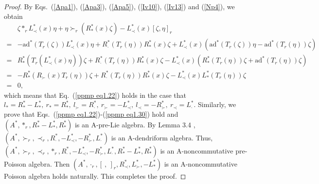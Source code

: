 \documentclass[12pt]{amsart}
\theoremstyle{definition}
\begin{document}
\begin{proof} 
By Eqs.~(\ref{Apa1}), (\ref{Apa3}), (\ref{Apa5}), (\ref{Iv10}), (\ref{Iv13}) and (\ref{Np4}), we obtain
\begin{align*}
	&\zeta \ast_{r} L_{\prec}^{*}(x)\eta+\eta \succ_{r}(R_{\ast}^{*}(x)\zeta)-L_{\prec}^{*}(x)[\zeta, \eta]_{r}\\=&
-\mathrm{ad}^{*} (T_{r}(\zeta))L_{\prec}^{*}(x)\eta+R_{\cdot}^{*}(T_{r}(\eta))R_{\ast}^{*}(x)\zeta
+L_{\prec}^{*}(x)(\mathrm{ad}^{*} (T_{r}(\zeta))\eta-\mathrm{ad}^{*} (T_{r}(\eta))\zeta)
\\=&R_{\ast}^{*}(T_{r}(L_{\prec}^{*}(x)\eta))\zeta+R_{\cdot}^{*}(T_{r}(\eta))R_{\ast}^{*}(x)\zeta
-L_{\prec}^{*}(x)(R_{\ast}^{*} (T_{r}(\eta))\zeta+\mathrm{ad}^{*} (T_{r}(\eta))\zeta)
\\=&-R_{\ast}^{*}(R_{\succ}(x)T_{r}(\eta))\zeta+R_{\cdot}^{*}(T_{r}(\eta))R_{\ast}^{*}(x)\zeta
-L_{\prec}^{*}(x)L_{\ast}^{*} (T_{r}(\eta))\zeta
\\=&0,\end{align*}
which means that Eq.~(\ref{ppmp eq1.22}) holds in the case that 
$l_{\ast}=R_{\ast}^{*}-L_{\ast}^{*},~ r_{\ast}=R_{\ast}^{*},~ l_{\succ}=R_{\cdot}^{*},~r_{\succ}=-L_{\prec}^{*},~
 l_{\prec}=-R_{\succ}^{*},~r_{\prec}=L_{\cdot}^{*}$.
 Similarly, we prove that Eqs.~(\ref{ppmp eq1.22})-(\ref{ppmp eq1.30}) hold
and $(A^{*},\ast_r,R^{*}_{\ast}-L_{\ast}^{*},R^{*}_{\ast})$
is an A-pre-Lie algebra. By Lemma 3.4 \cite{Wa}, $(A^{*},\succ_r,\prec_r,R_{\cdot}^{*},-L_{\prec}^{*},-R_{\succ}^{*},L_{\cdot}^{*})$
is an A-dendriform algebra. 
Thus, $(A^{*},\succ_r,\prec_r,\ast_r,R_{\cdot}^{*},
-L_{\prec}^{*},-R_{\succ}^{*},L_{\cdot}^{*},R^{*}_{\ast}-L_{\ast}^{*},R^{*}_{\ast})$
is an A-noncommutative pre-Poisson algebra. 
Then $(A^{*},\cdot_r,[ \ , \ ]_{r},R_{\prec}^{*}, L_{\succ}^{*},-L_{\ast}^{*})$ is 
an A-noncommutative Poisson algebra holds naturally.
This completes the proof.
\end{proof}
\end{document}
